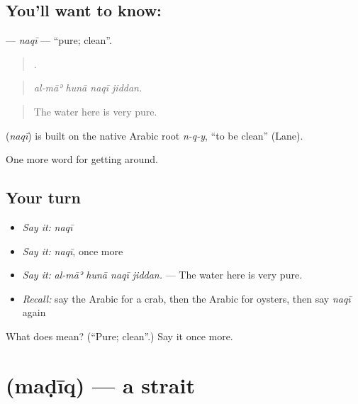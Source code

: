 \subsection*{You'll want to know: }
\textbf{} — \emph{naqī} — \textquotedblleft{}pure; clean\textquotedblright{}.

\begin{quote}
   .
\end{quote}

\begin{quote}
\emph{al-māʾ hunā naqī jiddan.}
\end{quote}

\begin{quote}
The water here is very pure.
\end{quote}

\begin{cousinweb}
\textbf{} (\emph{naqī}) is built on the native Arabic root \emph{n-q-y}, \textquotedblleft{}to be clean\textquotedblright{} (Lane).
\end{cousinweb}

\begin{grammarlens}[title={What you've built}]
One more word for getting around.
\end{grammarlens}

\subsection*{Your turn}
\begin{itemize}
\raggedright
  \item \emph{Say it:} \emph{naqī}
  \item \emph{Say it:} \emph{naqī}, once more
  \item \emph{Say it:} \emph{al-māʾ hunā naqī jiddan.} — The water here is very pure.
  \item \emph{Recall:} say the Arabic for a crab, then the Arabic for oysters, then say \emph{naqī} again
\end{itemize}

\begin{tcolorbox}[breakable,colback=teal!4,colframe=teal!35!black,title={Before you move on}]
What does  mean? (\textquotedblleft{}Pure; clean\textquotedblright{}.) Say it once more.
\end{tcolorbox}
\section[\texorpdfstring{\ar{مضيق} (maḍīq)}{مضيق (maḍīq)}]{ (maḍīq) — a strait}

